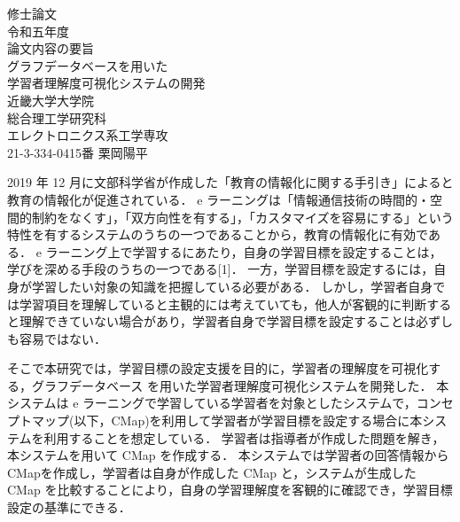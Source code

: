 \begin{titlepage}
\begin{center}
\vspace*{1cm}
\large
{\Huge 修\hspace{2zw}士\hspace{2zw}論\hspace{2zw}文}\\
\vspace*{1cm}
{\huge 令和五年度}\\
\vspace*{2cm}
{\huge 論文内容の要旨}\\
\vspace*{1cm}
{\LARGE グラフデータベースを用いた\\
学習者理解度可視化システムの開発
}\\
\vspace*{7cm}
\LARGE{近畿大学大学院\\
総合理工学研究科\\
エレクトロニクス系工学専攻\\
21-3-334-0415番 \hspace{0.5zw} 栗\hspace{0.5zw}岡\hspace{0.5zw}陽\hspace{0.5zw}平
}
\end{center}
\end{titlepage}

\newpage

\begin{titlepage}

    2019 年 12 月に文部科学省が作成した「教育の情報化に関する手引き」\cite{tebiki}によると教育の情報化が促進されている．
    e ラーニングは「情報通信技術の時間的・空間的制約をなくす」，「双方向性を有する」，「カスタマイズを容易にする」という特性を有するシステムのうちの一つであることから，教育の情報化に有効である．
    e ラーニング上で学習するにあたり，自身の学習目標を設定することは，学びを深める手段のうちの一つである[1]．
    一方，学習目標を設定するには，自身が学習したい対象の知識を把握している必要がある．
    しかし，学習者自身では学習項目を理解していると主観的には考えていても，他人が客観的に判断すると理解できていない場合があり，学習者自身で学習目標を設定することは必ずしも容易ではない．


    そこで本研究では，学習目標の設定支援を目的に，学習者の理解度を可視化する，グラフデータベース を用いた学習者理解度可視化システムを開発した．
    本システムは e ラーニングで学習している学習者を対象としたシステムで，コンセプトマップ(以下，CMap)を利用して学習者が学習目標を設定する場合に本システムを利用することを想定している．
    学習者は指導者が作成した問題を解き，本システムを用いて CMap を作成する．
    本システムでは学習者の回答情報から CMapを作成し，学習者は自身が作成した CMap と，システムが生成した CMap を比較することにより，自身の学習理解度を客観的に確認でき，学習目標設定の基準にできる．
    
    
\end{titlepage}
